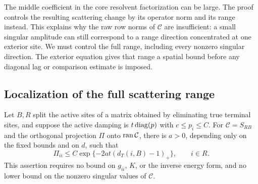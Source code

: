 The middle coefficient in the core resolvent factorization can be large.
The proof controls the resulting scattering change by its operator norm and
its range instead. This explains why the raw row norms of $\mathcal C$ are
insufficient: a small singular amplitude can still correspond to a range
direction concentrated at one exterior site. We must control the full range,
including every nonzero singular direction. The exterior equation gives
that range a spatial bound before any diagonal lag or comparison estimate
is imposed.

\subsection{Localization of the full scattering range}

\begin{lemma}
\label{lem:clearing-range-localization}
Let $B,R$ split the active sites of a matrix obtained by eliminating true
terminal sites, and suppose the active damping is $t\operatorname{diag}(p)$ with
$c\le p_i\le C$.  For $\mathcal C=S_{RB}$ and the orthogonal projection
$\Pi$ onto $\operatorname{ran} \mathcal C$, there is $a>0$, depending only on the fixed bounds and
on $d$, such that
\begin{equation}\label{eq:clearing-projection-decay}
 \Pi_{ii}\le C\exp\{-2at(d_T(i,B)-1)_+\},\qquad i\in R.
\end{equation}
This assertion requires no bound on $g_{ii}$, $K$, or the inverse energy
form, and no lower bound on the nonzero singular values of $\mathcal C$.
\end{lemma}

